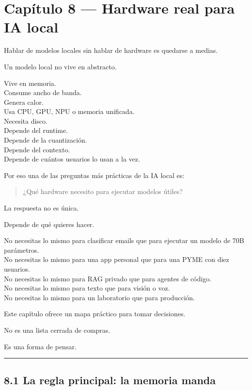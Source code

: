 \newpage

\chapter{Capítulo 8 --- Hardware real para IA
local}\label{capuxedtulo-8-hardware-real-para-ia-local}

Hablar de modelos locales sin hablar de hardware es quedarse a medias.

Un modelo local no vive en abstracto.

Vive en memoria.\\
Consume ancho de banda.\\
Genera calor.\\
Usa CPU, GPU, NPU o memoria unificada.\\
Necesita disco.\\
Depende del runtime.\\
Depende de la cuantización.\\
Depende del contexto.\\
Depende de cuántos usuarios lo usan a la vez.

Por eso una de las preguntas más prácticas de la IA local es:

\begin{quote}
¿Qué hardware necesito para ejecutar modelos útiles?
\end{quote}

La respuesta no es única.

Depende de qué quieres hacer.

No necesitas lo mismo para clasificar emails que para ejecutar un modelo
de 70B parámetros.\\
No necesitas lo mismo para una app personal que para una PYME con diez
usuarios.\\
No necesitas lo mismo para RAG privado que para agentes de código.\\
No necesitas lo mismo para texto que para visión o voz.\\
No necesitas lo mismo para un laboratorio que para producción.

Este capítulo ofrece un mapa práctico para tomar decisiones.

No es una lista cerrada de compras.

Es una forma de pensar.

\begin{center}\rule{0.5\linewidth}{0.5pt}\end{center}

\section{8.1 La regla principal: la memoria
manda}\label{la-regla-principal-la-memoria-manda}

